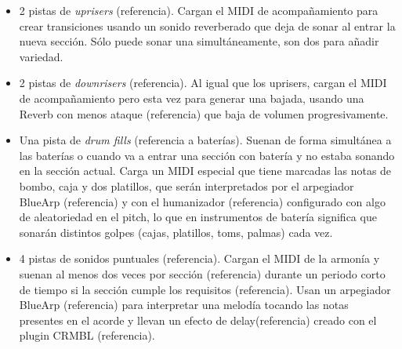 \begin{itemize}
\item 2 pistas de \textit{uprisers} (referencia). Cargan el MIDI de acompañamiento para crear transiciones usando un sonido reverberado que deja de sonar al entrar la nueva sección. Sólo puede sonar una simultáneamente, son dos para añadir variedad.

\item 2 pistas de \textit{downrisers} (referencia). Al igual que los uprisers, cargan el MIDI de acompañamiento pero esta vez para generar una bajada, usando una Reverb con menos ataque (referencia) que baja de volumen progresivamente.

\item Una pista de \textit{drum fills} (referencia a baterías). Suenan de forma simultánea a las baterías o cuando va a entrar una sección con batería y no estaba sonando en la sección actual. Carga un MIDI especial que tiene marcadas las notas de bombo, caja y dos platillos, que serán interpretados por el arpegiador BlueArp (referencia) y con el humanizador (referencia) configurado con algo de aleatoriedad en el pitch, lo que en instrumentos de batería significa que sonarán distintos golpes (cajas, platillos, toms, palmas) cada vez.

\item 4 pistas de sonidos puntuales (referencia). Cargan el MIDI de la armonía y suenan al menos dos veces por sección (referencia) durante un periodo corto de tiempo si la sección cumple los requisitos (referencia). Usan un arpegiador BlueArp (referencia) para interpretar una melodía tocando las notas presentes en el acorde y llevan un efecto de delay(referencia) creado con el plugin CRMBL (referencia).
\end{itemize}

